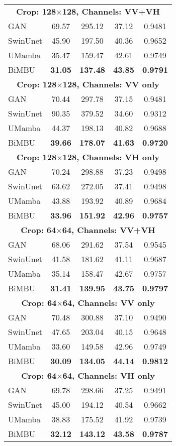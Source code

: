 \begin{table}
\begin{tabular}{lcccc}
    \multicolumn{5}{c}{\textbf{Crop: 128$\times$128, Channels: VV+VH}} \\
    GAN      & 69.57 & 295.12 & 37.12 & 0.9481 \\
    SwinUnet & 45.90 & 197.50 & 40.36 & 0.9652 \\
    UMamba   & 35.47 & 159.47 & 42.61 & 0.9749 \\
    BiMBU    & \textbf{31.05} & \textbf{137.48} & \textbf{43.85} & \textbf{0.9791} \\
    \hline
    \multicolumn{5}{c}{\textbf{Crop: 128$\times$128, Channels: VV only}} \\
    GAN      & 70.44 & 297.78 & 37.15 & 0.9481 \\
    SwinUnet & 90.35 & 379.52 & 34.60 & 0.9312 \\
    UMamba   & 44.37 & 198.13 & 40.82 & 0.9688 \\
    BiMBU    & \textbf{39.66} & \textbf{178.07} & \textbf{41.63} & \textbf{0.9720} \\
    \hline
    \multicolumn{5}{c}{\textbf{Crop: 128$\times$128, Channels: VH only}} \\
    GAN      & 70.24 & 298.88 & 37.23 & 0.9498 \\
    SwinUnet & 63.62 & 272.05 & 37.41 & 0.9498 \\
    UMamba   & 43.88 & 193.92 & 40.89 & 0.9684 \\
    BiMBU    & \textbf{33.96} & \textbf{151.92} & \textbf{42.96} & \textbf{0.9757} \\
    \hline
    
    \multicolumn{5}{c}{\textbf{Crop: 64$\times$64, Channels: VV+VH}} \\
    GAN      & 68.06 & 291.62 & 37.54 & 0.9545 \\
    SwinUnet & 41.58 & 181.62 & 41.11 & 0.9687 \\
    UMamba   & 35.14 & 158.47 & 42.67 & 0.9757 \\
    BiMBU    & \textbf{31.41} & \textbf{139.95} & \textbf{43.75} & \textbf{0.9797} \\
    \hline
    \multicolumn{5}{c}{\textbf{Crop: 64$\times$64, Channels: VV only}} \\
    GAN      & 70.48 & 300.88 & 37.10 & 0.9490 \\
    SwinUnet & 47.65 & 203.04 & 40.15 & 0.9648 \\
    UMamba   & 33.60 & 149.58 & 42.96 & 0.9749 \\
    BiMBU    & \textbf{30.09} & \textbf{134.05} & \textbf{44.14} & \textbf{0.9812} \\
    \hline
    \multicolumn{5}{c}{\textbf{Crop: 64$\times$64, Channels: VH only}} \\
    GAN      & 69.78 & 298.66 & 37.25 & 0.9491 \\
    SwinUnet & 45.00 & 194.12 & 40.54 & 0.9662 \\
    UMamba   & 38.83 & 175.52 & 41.92 & 0.9739 \\
    BiMBU    & \textbf{32.12} & \textbf{143.12} & \textbf{43.58} & \textbf{0.9787} \\
    \hline
    

\end{tabular}
\end{table}
